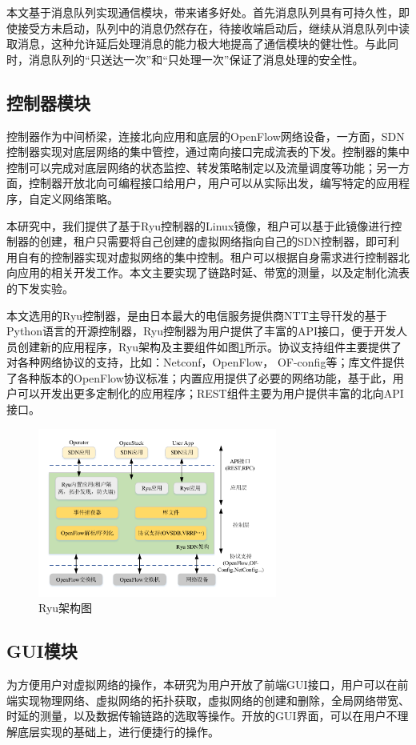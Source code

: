 本文基于消息队列实现通信模块，带来诸多好处。首先消息队列具有可持久性，即使接受方未启动，队列中的消息仍然存在，待接收端启动后，继续从消息队列中读取消息，这种允许延后处理消息的能力极大地提高了通信模块的健壮性。与此同时，消息队列的“只送达一次”和“只处理一次”保证了消息处理的安全性。

\subsection{控制器模块}
控制器作为中间桥梁，连接北向应用和底层的OpenFlow网络设备，一方面，SDN控制器实现对底层网络的集中管控，通过南向接口完成流表的下发。控制器的集中控制可以完成对底层网络的状态监控、转发策略制定以及流量调度等功能；另一方面，控制器开放北向可编程接口给用户，用户可以从实际出发，编写特定的应用程序，自定义网络策略。

本研究中，我们提供了基于Ryu控制器的Linux镜像，租户可以基于此镜像进行控制器的创建，租户只需要将自己创建的虚拟网络指向自己的SDN控制器，即可利用自有的控制器实现对虚拟网络的集中控制。租户可以根据自身需求进行控制器北向应用的相关开发工作。本文主要实现了链路时延、带宽的测量，以及定制化流表的下发实验。

本文选用的Ryu控制器，是由日本最大的电信服务提供商NTT主导幵发的基于Python语言的开源控制器，Ryu控制器为用户提供了丰富的API接口，便于开发人员创建新的应用程序，Ryu架构及主要组件如图\ref{fig:ryu}所示\cite{Ryu-1}。协议支持组件主要提供了对各种网络协议的支持，比如：Netconf，OpenFlow， OF-config等；库文件提供了各种版本的OpenFlow协议标准；内置应用提供了必要的网络功能，基于此，用户可以开发出更多定制化的应用程序；REST组件主要为用户提供丰富的北向API接口。

\begin{figure}[!htb]
  \centering
  \includegraphics[width=0.7\textwidth]{logo/ryu}
  \caption{Ryu架构图}
  \label{fig:ryu}
\end{figure}

\subsection{GUI模块}
为方便用户对虚拟网络的操作，本研究为用户开放了前端GUI接口，用户可以在前端实现物理网络、虚拟网络的拓扑获取，虚拟网络的创建和删除，全局网络带宽、时延的测量，以及数据传输链路的选取等操作。开放的GUI界面，可以在用户不理解底层实现的基础上，进行便捷行的操作。

